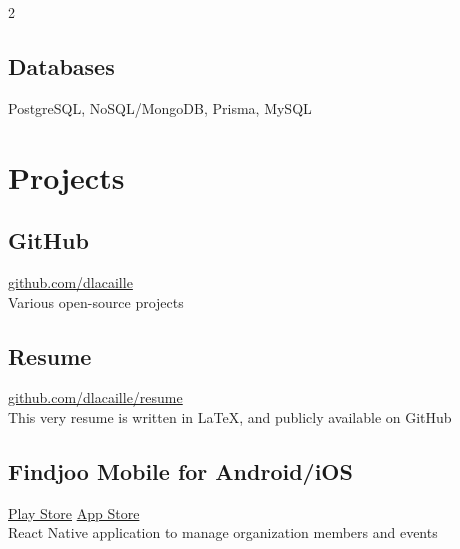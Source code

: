\documentclass{article}
\begin{document}
\begin{paracol}{2}
\begin{leftcolumn}
    \subsection{Databases}
    PostgreSQL, NoSQL/MongoDB, Prisma, MySQL

    \section{Projects}

    \subsection{GitHub}
    \href{https://github.com/dlacaille}{\faGithub\hspace{0.5em}github.com/dlacaille}\\
    Various open-source projects
    
    \vspace{0.5em}
    
    \subsection{Resume}
    \href{https://github.com/dlacaille/resume}{\faNewspaper[regular]\hspace{0.5em}github.com/dlacaille/resume}\\
    This very resume is written in LaTeX, and publicly available on GitHub

    \vspace{0.5em}

    \subsection{Findjoo Mobile for Android/iOS}
    \href{https://play.google.com/store/apps/details?id=com.findjoomobile}{\faGooglePlay\hspace{0.5em}Play Store}\hspace{1em}
    \href{https://apps.apple.com/us/app/findjoo/id1499583717}{\faAppStore\hspace{0.5em}App Store}\\
    React Native application to manage organization members and events


\end{leftcolumn}
\end{paracol}
\end{document}
